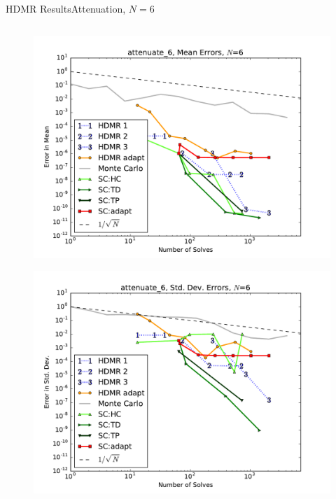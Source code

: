 \documentclass{beamer}
\begin{document}
\begin{frame}{HDMR Results}{Attenuation, $N=6$}
\begin{columns}
\begin{column}{0.5\textwidth}
\begin{figure}[h!]
          \includegraphics[width=0.8\linewidth]{anlmodels/attenuate_6_mean_errs}
        \end{figure}
        \vspace{-20pt}
        \begin{figure}[h!]
          \centering
          \includegraphics[width=0.8\linewidth]{anlmodels/attenuate_6_variance_errs}
        \end{figure}
   \end{column}
 \end{columns}
\end{frame}
\end{document}
